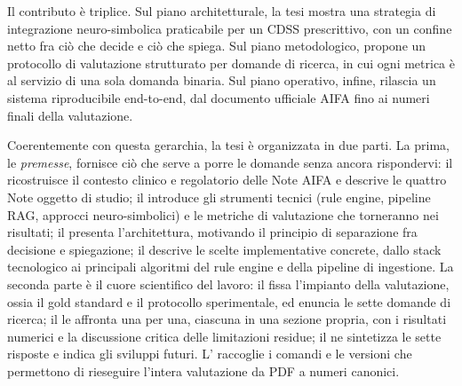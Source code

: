 Il contributo è triplice. Sul piano architetturale, la tesi mostra una strategia di integrazione neuro-simbolica praticabile per un CDSS prescrittivo, con un confine netto fra ciò che decide e ciò che spiega. Sul piano metodologico, propone un protocollo di valutazione strutturato per domande di ricerca, in cui ogni metrica è al servizio di una sola domanda binaria. Sul piano operativo, infine, rilascia un sistema riproducibile end-to-end, dal documento ufficiale AIFA fino ai numeri finali della valutazione.

Coerentemente con questa gerarchia, la tesi è organizzata in due parti. La prima, le \emph{premesse}, fornisce ciò che serve a porre le domande senza ancora rispondervi: il  ricostruisce il contesto clinico e regolatorio delle Note AIFA e descrive le quattro Note oggetto di studio; il  introduce gli strumenti tecnici (rule engine, pipeline RAG, approcci neuro-simbolici) e le metriche di valutazione che torneranno nei risultati; il  presenta l'architettura, motivando il principio di separazione fra decisione e spiegazione; il  descrive le scelte implementative concrete, dallo stack tecnologico ai principali algoritmi del rule engine e della pipeline di ingestione. La seconda parte è il cuore scientifico del lavoro: il  fissa l'impianto della valutazione, ossia il gold standard e il protocollo sperimentale, ed enuncia le sette domande di ricerca; il  le affronta una per una, ciascuna in una sezione propria, con i risultati numerici e la discussione critica delle limitazioni residue; il  ne sintetizza le sette risposte e indica gli sviluppi futuri. L' raccoglie i comandi e le versioni che permettono di rieseguire l'intera valutazione da PDF a numeri canonici.
